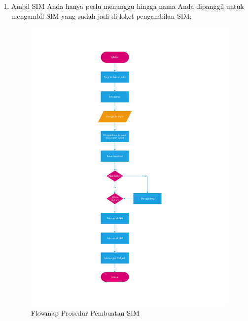\begin{enumerate}
    \item Ambil SIM
    Anda hanya perlu menunggu hingga nama Anda dipanggil untuk mengambil SIM yang sudah jadi di loket pengambilan SIM;
    
   
	
	\begin{figure}[H]
		\centering
		\includegraphics[width=16cm]{figures/simflow2.jpg}
		\caption{Flowmap Prosedur Pembuatan SIM}	
	\end{figure}
\end{enumerate}
